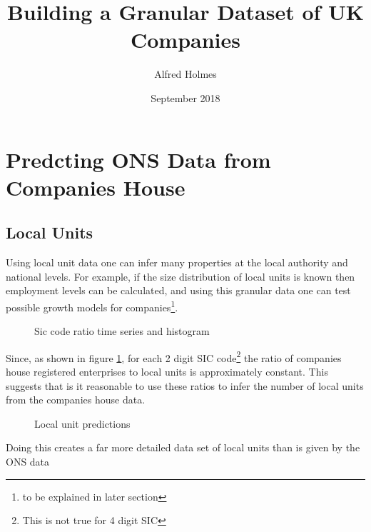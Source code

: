 \documentclass[a4paper,10pt]{article}
\title{Building a Granular Dataset of UK Companies}
\author{Alfred Holmes}
\date{September 2018}
\begin{document}
\maketitle

\section{Predcting ONS Data from Companies House}
\subsection{Local Units}
Using local unit data one can infer many properties at the local authority and national levels. For example, if the size distribution of local units is known then employment levels can be calculated, and using this granular data one can test possible growth models for companies\footnote{to be explained in later section}.
\begin{figure}[!ht]
 \caption{Sic code ratio time series and histogram}
 \label{sic_ratio}
\end{figure}

Since, as shown in figure \ref{sic_ratio}, for each 2 digit SIC code\footnote{This is not true for 4 digit SIC} the ratio of companies house registered enterprises to local units is approximately constant. This suggests that is it reasonable to use these ratios to infer the number of local units from the companies house data.

\begin{figure}[!ht]
 \caption{Local unit predictions}
 \label{local_unit_predictions}
\end{figure}

Doing this creates a far more detailed data set of local units than is given by the ONS data 
\end{document}
